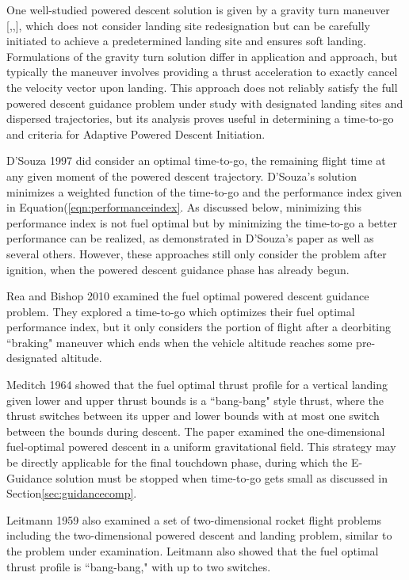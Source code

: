 One well-studied powered descent solution is given by a gravity turn maneuver [\cite{MCINNES},\:\cite{CHOMEL},\:\cite{CITRON}], which does not consider landing site redesignation but can be carefully initiated to achieve a predetermined landing site and ensures soft landing. Formulations of the gravity turn solution differ in application and approach, but typically the maneuver involves providing a thrust acceleration to exactly cancel the velocity vector upon landing. This approach does not reliably satisfy the full powered descent guidance problem under study with designated landing sites and dispersed trajectories, but its analysis proves useful in determining a time-to-go and criteria for Adaptive Powered Descent Initiation.

D'Souza 1997\:\cite{DSOUZA} did consider an optimal time-to-go, the remaining flight time at any given moment of the powered descent trajectory. D'Souza's solution minimizes a weighted function of the time-to-go and the performance index given in Equation\:(\ref{eqn:performanceindex}. As discussed below, minimizing this performance index is not fuel optimal but by minimizing the time-to-go a better performance can be realized, as demonstrated in D'Souza's paper as well as several others. However, these approaches still only consider the problem after ignition, when the powered descent guidance phase has already begun.

Rea and Bishop 2010\:\cite{REA} examined the fuel optimal powered descent guidance problem. They explored a time-to-go which optimizes their fuel optimal performance index, but it only considers the portion of flight after a deorbiting ``braking" maneuver which ends when the vehicle altitude reaches some pre-designated altitude.

Meditch 1964\:\cite{MEDITCH} showed that the fuel optimal thrust profile for a vertical landing given lower and upper thrust bounds is a ``bang-bang" style thrust, where the thrust switches between its upper and lower bounds with at most one switch between the bounds during descent. The paper examined the one-dimensional fuel-optimal powered descent in a uniform gravitational field. This strategy may be directly applicable for the final touchdown phase, during which the E-Guidance solution must be stopped when time-to-go gets small as discussed in Section\:\ref{sec:guidancecomp}.

Leitmann 1959\:\cite{LEITMANN} also examined a set of two-dimensional rocket flight problems including the two-dimensional powered descent and landing problem, similar to the problem under examination. Leitmann also showed that the fuel optimal thrust profile is ``bang-bang," with up to two switches.


